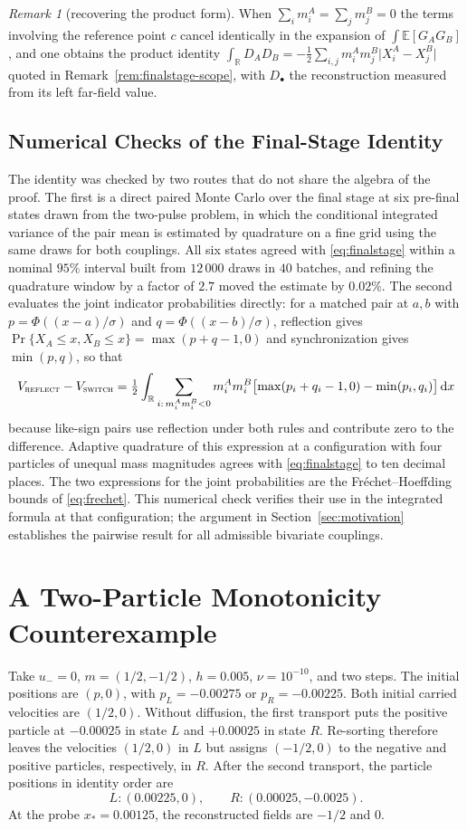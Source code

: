 \documentclass[smallextended,nospthms]{svjour3}
\theoremstyle{plain}
\theoremstyle{definition}
\theoremstyle{remark}
\newtheorem{remark}[proposition]{Remark}
\numberwithin{equation}{section}
\newcommand{\E}{\mathbb{E}}
\newcommand{\R}{\mathbb{R}}
\newcommand{\refl}{\textnormal{\textsc{reflect}}}
\newcommand{\swi}{\textnormal{\textsc{switch}}}
\begin{document}
\begin{remark}[recovering the product form]
When $\sum_i m^A_i=\sum_j m^B_j=0$ the terms involving the reference point $c$
cancel identically in the expansion of $\int\E[G_AG_B]$, and one obtains the
product identity
$\int_\R D_AD_B=-\tfrac12\sum_{i,j}m^A_im^B_j\bigl|X^A_i-X^B_j\bigr|$
quoted in Remark~\ref{rem:finalstage-scope}, with
$D_\bullet$ the reconstruction measured from its left far-field value.
\end{remark}

\subsection{Numerical Checks of the Final-Stage Identity}
\label{app:finalcheck}

The identity was checked by two routes that do not share the algebra of the
proof. The first is a direct paired Monte Carlo over the final stage at six
pre-final states drawn from the two-pulse problem, in which the conditional
integrated variance of the pair mean is estimated by quadrature on a fine grid
using the same draws for both couplings. All six states agreed with
\eqref{eq:finalstage} within a nominal $95\%$ interval built from $12\,000$
draws in $40$ batches, and refining the quadrature window by a factor of $2.7$
moved the estimate by $0.02\%$. The second evaluates the joint indicator
probabilities directly: for a matched pair at $a,b$ with
$p=\Phi((x-a)/\sigma)$ and $q=\Phi((x-b)/\sigma)$, reflection gives
$\Pr\{X_A\le x,X_B\le x\}=\max(p+q-1,0)$ and synchronization gives
$\min(p,q)$, so that
\[
 V_{\refl}-V_{\swi}
 =\tfrac12\int_\R\sum_{i:\,m^A_im^B_i<0} m^A_im^B_i
   \bigl[\max(p_i+q_i-1,0)-\min(p_i,q_i)\bigr]\,\mathrm dx
\]
because like-sign pairs use reflection under both rules and contribute zero
to the difference. Adaptive quadrature of this expression at a
configuration with four particles of unequal mass magnitudes agrees with
\eqref{eq:finalstage} to ten decimal places. The two expressions for the joint
probabilities are the Fréchet--Hoeffding bounds of \eqref{eq:frechet}. This
numerical check verifies their use in the integrated formula at that
configuration; the argument in Section~\ref{sec:motivation} establishes the
pairwise result for all admissible bivariate couplings.

\section{A Two-Particle Monotonicity Counterexample}
\label{app:counterexample}
Take $u_-=0$, $m=(1/2,-1/2)$, $h=0.005$, $\nu=10^{-10}$, and two steps.
The initial positions are $(p,0)$, with $p_L=-0.00275$ or
$p_R=-0.00225$. Both initial carried velocities are $(1/2,0)$.
Without diffusion, the first transport puts the positive particle at
$-0.00025$ in state $L$ and $+0.00025$ in state $R$. Re-sorting therefore
leaves the velocities $(1/2,0)$ in $L$ but assigns $(-1/2,0)$ to the
negative and positive particles, respectively, in $R$. After the second
transport, the particle positions in identity order are
\[
 L:(0.00225,0),\qquad R:(0.00025,-0.0025).
\]
At the probe $x_*=0.00125$, the reconstructed fields are $-1/2$ and $0$.
\end{document}
